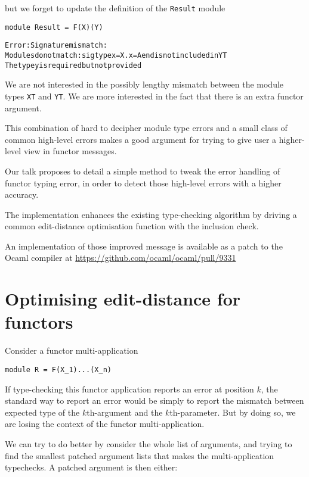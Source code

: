 \documentclass{article}
\begin{document}
but we forget to update the definition of the \texttt{Result} module

\begin{verbatim}
module Result = F(X)(Y)
\end{verbatim}
\begin{alltt}
Error: Signature mismatch:
       Modules do not match: sig type x = X.x = A end is not included in YT
       The type y is required but not provided
\end{alltt}

We are not interested in the possibly lengthy mismatch between the module types \texttt{XT} and \texttt{YT}.
We are more interested in the fact that there is an extra functor argument.

This combination of hard to decipher module type errors and a small class of common high-level errors makes
a good argument for trying to give user a higher-level view in functor messages.


Our talk proposes to detail a simple method to tweak the error handling of functor typing error,
in order to detect those high-level errors with a higher accuracy.

The implementation enhances the existing type-checking algorithm by driving a common
edit-distance optimisation function with the inclusion check.

An implementation of those improved message is available as a patch to the Ocaml compiler at
\url{https://github.com/ocaml/ocaml/pull/9331}


\section{Optimising edit-distance for functors}

Consider a functor multi-application

\begin{verbatim}
module R = F(X_1)...(X_n)
\end{verbatim}

If type-checking this functor application reports an error at position $k$, the standard
way to report an error would be simply to report the mismatch between expected type of
the $k$th-argument and the $k$th-parameter. But by doing so, we are losing the context of the
functor multi-application.

We can try to do better by consider the whole list of arguments, and trying to find the smallest patched argument lists that makes the multi-application typechecks. A patched argument is then either:
\end{document}
